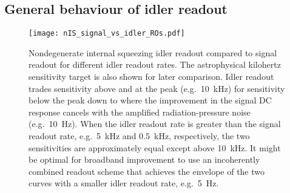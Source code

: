 \subsection{General behaviour of idler readout}
\label{sec:nIS_general_behaviour_idler}

\begin{figure}
    \centering
    \texttt{[image: nIS\_signal\_vs\_idler\_ROs.pdf]}
    \caption{  Nondegenerate internal squeezing idler readout compared to signal readout for different idler readout rates. The astrophysical kilohertz sensitivity target is also shown for later comparison. Idler readout trades sensitivity above and at the peak (e.g.\ 10~kHz) for sensitivity below the peak down to where the improvement in the signal DC response cancels with the amplified radiation-pressure noise (e.g.\ 10~Hz). When the idler readout rate is greater than the signal readout rate, e.g.\ 5~kHz and $0.5$~kHz, respectively, the two sensitivities are approximately equal except above 10~kHz. It might be optimal for broadband improvement to use an incoherently combined readout scheme that achieves the envelope of the two curves with a smaller idler readout rate, e.g.\ 5~Hz.
    }
    \label{fig:nIS_signal_vs_idler_ROs}
\end{figure}

